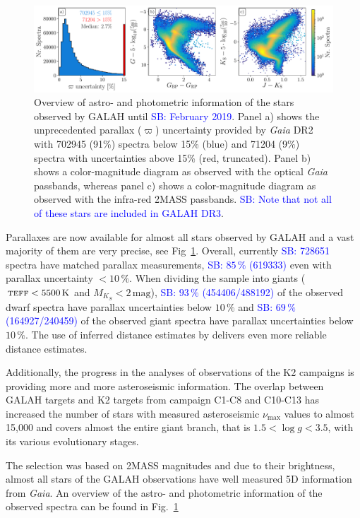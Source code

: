 \documentclass[fleqn,usenatbib,useAMS]{mnras}
\newcommand{\Gaia}{\textit{Gaia}\xspace}
\newcommand\SB[1]{\textcolor{blue}{SB: #1}}
\begin{document}
\begin{figure}
\centering
\includegraphics[width=\textwidth]{figures/plot_parallax_quality_and_cmds.pdf}
\caption{Overview of astro- and photometric information of the stars observed by GALAH until \SB{February 2019}. Panel a) shows the unprecedented parallax ($\varpi$) uncertainty provided by \Gaia DR2 with 702945 (91\%) spectra below 15\% (blue) and 71204 (9\%) spectra with uncertainties above 15\% (red, truncated). Panel b) shows a color-magnitude diagram as observed with the optical \Gaia passbands, whereas panel c) shows a color-magnitude diagram as observed with the infra-red 2MASS passbands. \SB{Note that not all of these stars are included in GALAH DR3}.}
\label{fig:plot_parallax_quality_and_cmds}
\end{figure}

Parallaxes are now available for almost all stars observed by GALAH and a vast majority of them are very precise, see Fig~\ref{fig:plot_parallax_quality_and_cmds}. Overall, currently \SB{728651} spectra have matched parallax measurements, \SB{$85\,\%$ (619333)} even with parallax uncertainty $<10\,\%$. When dividing the sample into giants ($\textsc{teff} < 5500\,\mathrm{K}$ and $M_{K_S} < 2\,\mathrm{mag}$), \SB{$93\,\%$ (454406/488192)} of the observed dwarf spectra have parallax uncertainties below $10\,\%$ and \SB{$69\,\%$ (164927/240459)} of the observed giant spectra have parallax uncertainties below $10\,\%$. The use of inferred distance estimates by \citet{BailerJones2018} delivers even more reliable distance estimates.

Additionally, the progress in the analyses of observations of the K2 campaigns is providing more and more asteroseismic information. The overlap between GALAH targets and K2 targets from campaign C1-C8 and C10-C13 has increased the number of stars with measured asteroseismic $\nu_\mathrm{max}$ values to almost 15,000 and covers almost the entire giant branch, that is $1.5 < \log g < 3.5$, with its various evolutionary stages.

The selection was based on 2MASS \citep{Skrutskie2006} magnitudes and due to their brightness, almost all stars of the GALAH observations have well measured 5D information from \Gaia \citep{Brown2018, Lindegren2018}. An overview of the astro- and photometric information of the observed spectra can be found in Fig.~\ref{fig:plot_parallax_quality_and_cmds}
\end{document}
